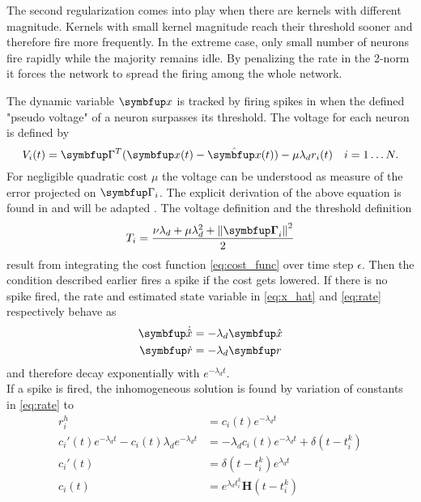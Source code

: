 The second regularization comes into play when there are kernels with different magnitude. Kernels with small kernel magnitude reach their threshold sooner and therefore fire more frequently. In the extreme case, only small number of neurons fire rapidly while the majority remains idle. By penalizing the rate in the 2-norm it forces the network to spread the firing among the whole network.\\


The dynamic variable $\bmu{x}$ is tracked by firing spikes in when the defined "pseudo voltage" of a neuron surpasses its threshold. The voltage for each neuron is defined by
\begin{equation}\label{eq:voltage}
	V_i(t)=\bmu{\Gamma}^T(\bmu{x}(t)-\hat{\bmu{x}}(t))-\mu \lambda_d r_i(t)
\quad i  = 1\dots N.
\end{equation}
For negligible quadratic cost $\mu$ the voltage can be understood as measure of the error projected on $\bmu{\Gamma}_i$. The explicit derivation of the above equation is found in \cite{boerlin_predictive_2013} and will be adapted . The voltage definition and the threshold definition
\begin{equation}
	T_i=\frac{\nu \lambda_d+\mu \lambda_d^2+\left\|\boldsymbol{\bmu{\Gamma}}_i\right\|^2}{2}
\end{equation}
result from integrating the cost function \cref{eq:cost_func} over time step $\epsilon$. Then the condition described earlier fires a spike if the cost gets lowered. If there is no spike fired, the rate and estimated state variable in \cref{eq:x_hat} and \cref{eq:rate} respectively behave as
\begin{equation}
	\begin{aligned}
		\bmu{\dot{\hat{x}}} &= -\lambda_d \bmu{\hat{x}}\\
		\bmu{\dot{r}} &= -\lambda_d\bmu{r}
	\end{aligned}
\end{equation}
and therefore decay exponentially with $e^{-\lambda_d t}$.\\
If a spike is fired, the inhomogeneous solution is found by variation of constants in \cref{eq:rate} to
\begin{equation}
\begin{aligned}
	r_i^h &= c_i(t)e^{-\lambda_d t}\\
	c_i'(t) e^{-\lambda_d t} - c_i(t)\lambda_d e^{-\lambda_d t}&= -\lambda_d c_i(t)e^{-\lambda_d t} + \delta(t- t_i^k)\\
	c_i'(t) &= \delta(t- t_i^k) e^{\lambda_d t}\\
	c_i(t) &=  e^{\lambda_d t_i^k} \bm{H}(t-t_i^k)
\end{aligned}
\end{equation}
